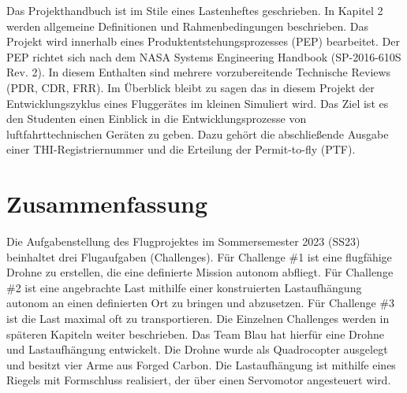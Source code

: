 Das Projekthandbuch ist im Stile eines Lastenheftes geschrieben. In Kapitel 2 werden allgemeine Definitionen und Rahmenbedingungen beschrieben. Das Projekt wird innerhalb eines Produktentstehungsprozesses (PEP) bearbeitet. Der PEP richtet sich nach dem NASA Systems Engineering Handbook (SP-2016-610S Rev. 2). In diesem Enthalten sind mehrere vorzubereitende Technische Reviews (PDR, CDR, FRR). Im Überblick bleibt zu sagen das in diesem Projekt der Entwicklungszyklus eines Fluggerätes im kleinen Simuliert wird. Das Ziel ist es den Studenten einen Einblick in die Entwicklungsprozesse von luftfahrttechnischen Geräten zu geben. Dazu gehört die abschließende Ausgabe einer THI-Registriernummer und die Erteilung der Permit-to-fly (PTF).

\section{Zusammenfassung} %
Die Aufgabenstellung des Flugprojektes im Sommersemester 2023 (SS23) beinhaltet drei Flugaufgaben (Challenges). Für Challenge \#1 ist eine flugfähige Drohne zu erstellen, die eine definierte Mission autonom abfliegt. Für Challenge \#2 ist eine angebrachte Last mithilfe einer konstruierten Lastaufhängung autonom an einen definierten Ort zu bringen und abzusetzen. Für Challenge \#3 ist die Last maximal oft zu transportieren. Die Einzelnen Challenges werden in späteren Kapiteln weiter beschrieben. Das Team Blau hat hierfür eine Drohne und Lastaufhängung entwickelt. Die Drohne wurde als Quadrocopter ausgelegt und besitzt vier Arme aus Forged Carbon. Die Lastaufhängung ist mithilfe eines Riegels mit Formschluss realisiert, der über einen Servomotor angesteuert wird.